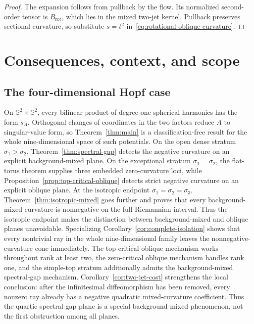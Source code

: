 \documentclass[11pt]{amsart}
\theoremstyle{definition}
\theoremstyle{remark}
\newcommand{\Sph}{\mathbb S}
\begin{document}
\begin{proof}
The expansion follows from pullback by the flow.  Its normalized
second-order tensor is $B_{\mathrm{rot}}$, which lies in the mixed
two-jet kernel.  Pullback preserves sectional curvature, so substitute
$s=t^2$ in~\eqref{eq:rotational-oblique-curvature}.
\end{proof}

\section{Consequences, context, and scope}\label{sec:scope}

\subsection{The four-dimensional Hopf case}

On $\Sph^2\times\Sph^2$, every bilinear product of degree-one
spherical harmonics has the form $s_A$.  Orthogonal changes of
coordinates in the two factors reduce $A$ to singular-value form, so
Theorem~\ref{thm:main} is a classification-free result for the whole
nine-dimensional space of such potentials.  On the open dense stratum
$\sigma_1>\sigma_2$, Theorem~\ref{thm:spectral-gap} detects the
negative curvature on an explicit background-mixed plane.  On the
exceptional stratum $\sigma_1=\sigma_2$, the flat-torus theorem
supplies three embedded zero-curvature loci, while
Proposition~\ref{prop:top-critical-oblique} detects strict negative
curvature on an explicit oblique plane.
At the isotropic endpoint $\sigma_1=\sigma_2=\sigma_3$,
Theorem~\ref{thm:isotropic-mixed} goes further and proves that every
background-mixed curvature is nonnegative on the full Riemannian
interval.  Thus the isotropic endpoint makes the distinction between
background-mixed and oblique planes unavoidable.  Specializing
Corollary~\ref{cor:complete-isolation} shows that every nontrivial ray
in the whole nine-dimensional family leaves the
nonnegative-curvature cone immediately.  The top-critical oblique
mechanism works throughout rank at least two, the zero-critical
oblique mechanism handles rank one, and the simple-top stratum
additionally admits the background-mixed spectral-gap mechanism.
Corollary~\ref{cor:two-jet-cost} strengthens the local conclusion:
after the infinitesimal diffeomorphism has been removed, every
nonzero ray already has a negative quadratic mixed-curvature
coefficient.  Thus the quartic spectral-gap plane is a special
background-mixed phenomenon, not the first obstruction among all
planes.
\end{document}
